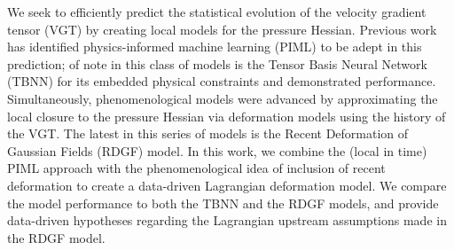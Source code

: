 We seek to efficiently predict the statistical evolution of the velocity gradient tensor (VGT) by creating local models for the pressure Hessian. Previous work has identified physics-informed machine learning (PIML) to be adept in this prediction; of note in this class of models is the Tensor Basis Neural Network (TBNN) for its embedded physical constraints and demonstrated performance. Simultaneously, phenomenological models were advanced by approximating the local closure to the pressure Hessian via deformation models using the history of the VGT. The latest in this series of models is the Recent Deformation of Gaussian Fields (RDGF) model. In this work, we combine the (local in time) PIML approach with the phenomenological idea of inclusion of recent deformation to create a data-driven Lagrangian deformation model. We compare the model performance to both the TBNN and the RDGF models, and provide data-driven hypotheses regarding the Lagrangian upstream assumptions made in the RDGF model.

